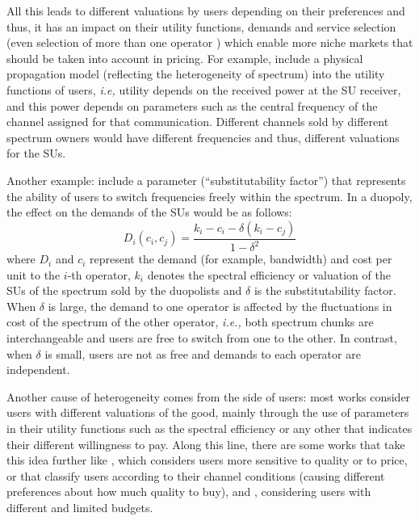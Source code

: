 All this leads to different valuations by users depending on their preferences and thus, it has an impact on their utility functions, demands and service selection (even selection of more than one operator \cite{ref:Jia2008_com}) which enable more niche markets that should be taken into account in pricing. For example, \cite{ref:Xing2007,ref:Min2011,ref:Dixit2010} include a physical propagation model (reflecting the heterogeneity of spectrum) into the utility functions of users, \textit{i.e,} utility depends on the received power at the SU receiver, and this power depends on parameters such as the central frequency of the channel assigned for that communication. Different channels sold by different spectrum owners would have different frequencies and thus, different valuations for the SUs.

Another example: \cite{ref:Niyato2008_Comp,ref:Niyato2007_Eq} include a parameter (``substitutability factor'') that represents the ability of users to switch frequencies freely within the spectrum. In a duopoly, the effect on the demands of the SUs would be as follows: 
\begin{equation}
D_i (c_i,c_j) = \frac{k_i - c_i - \delta(k_i - c_j)}{1 - \delta^2}
\end{equation}
where $D_i$ and $c_i$ represent the demand (for example, bandwidth) and cost per unit to the $i$-th operator, $k_i$ denotes the spectral efficiency or valuation of the SUs of the spectrum sold by the duopolists and $\delta$ is the substitutability factor. When $\delta$ is large, the demand to one operator is affected by the fluctuations in cost of the spectrum of the other operator, \textit{i.e.,} both spectrum chunks are interchangeable and users are free to switch from one to the other. In contrast, when $\delta$ is small, users are not as free and demands to each operator are independent. 

Another cause of heterogeneity comes from the side of users: most works consider users with different valuations of the good, mainly through the use of parameters in their utility functions such as the spectral efficiency or any other that indicates their different willingness to pay. Along this line, there are some works that take this idea further like \cite{ref:Xing2007}, which considers users more sensitive to quality or to price, or \cite{ref:Gao2011,ref:Duan2011_Contract} that classify users according to their channel conditions (causing different preferences about how much quality to buy), and \cite{ref:Yang2011,ref:Xing2007}, considering users with different and limited budgets.

